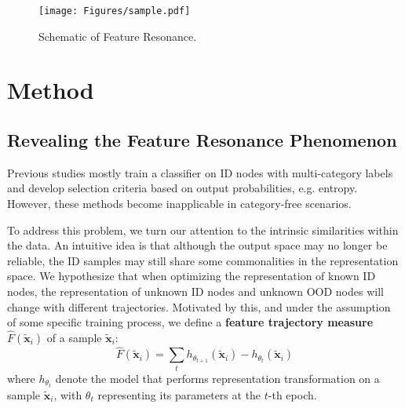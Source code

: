 

\begin{figure}[!t]
\centering	\texttt{[image: Figures/sample.pdf]}
    \caption{Schematic of Feature Resonance.}
    \label{F-sample}
\end{figure}


\section{Method}\label{Sec-Method}

\subsection{Revealing the Feature Resonance Phenomenon}\label{subsec-reveal-FR}
Previous studies \citep{hendrycks2016baseline,liu2020energy,wu2023energy} mostly train a classifier on ID nodes with multi-category labels and develop selection criteria based on output probabilities, e.g. entropy. 
However, these methods become inapplicable in category-free scenarios.

To address this problem, we turn our attention to the intrinsic similarities within the data. An intuitive idea is that although the output space may no longer be reliable, the ID samples may still share some commonalities in the representation space.
We hypothesize that when optimizing the representation of known ID nodes, the representation of unknown ID nodes and unknown OOD nodes will change with different trajectories. Motivated by this, and under the assumption of some specific training process, we define a \textbf{feature trajectory measure} $\hat{F}(\tilde{\mathbf{x}}_i)$ of a sample \(\tilde{\mathbf{x}}_i\):
\begin{equation}\label{equa-trajectory}
    \hat{F}(\tilde{\mathbf{x}}_i) =   \sum_t h_{\theta_{t+1}}(\tilde{\mathbf{x}}_i) - h_{\theta_t}(\tilde{\mathbf{x}}_i)
\end{equation}
where \(h_{\theta_t} \) denote the model that performs representation transformation on a sample \( \tilde{\mathbf{x}}_i \), with \( \theta_t \) representing its parameters at the \( t \)-th epoch.  

